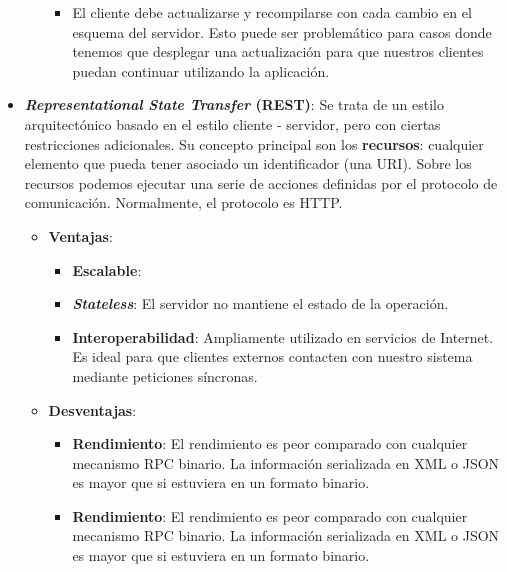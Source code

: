 \begin{itemize}
\begin{itemize}
\begin{itemize}
      \item El cliente debe actualizarse y recompilarse con cada cambio en el esquema del servidor. Esto puede ser problemático para casos donde tenemos que desplegar una actualización para que nuestros clientes puedan continuar utilizando la aplicación.
    \end{itemize}
  \end{itemize}

  \item \textbf{\textit{Representational State Transfer} (REST)}: Se trata de un estilo arquitectónico basado en el estilo cliente - servidor, pero con ciertas restricciones adicionales. \cite{taylorSoftwareArchitectureFoundations2009} Su concepto principal son los \textbf{recursos}: cualquier elemento que pueda tener asociado un identificador (una URI). \cite{richardsonRESTfulWebServices2007} Sobre los recursos podemos ejecutar una serie de acciones definidas por el protocolo de comunicación. Normalmente, el protocolo es HTTP.

  \begin{itemize}
    \item \textbf{Ventajas}:

    \begin{itemize}
      \item \textbf{Escalable}:

      \item \textbf{\textit{Stateless}}: El servidor no mantiene el estado de la operación.

      \item \textbf{Interoperabilidad}: Ampliamente utilizado en servicios de Internet. Es ideal para que clientes externos contacten con nuestro sistema mediante peticiones síncronas. \cite{newmanBuildingMicroservicesDesigning2021}
    \end{itemize}
  \end{itemize}

  \begin{itemize}
    \item \textbf{Desventajas}:

    \begin{itemize}
      \item \textbf{Rendimiento}: El rendimiento es peor comparado con cualquier mecanismo RPC binario. La información serializada en XML o JSON es mayor que si estuviera en un formato binario.

      \item \textbf{Rendimiento}: El rendimiento es peor comparado con cualquier mecanismo RPC binario. La información serializada en XML o JSON es mayor que si estuviera en un formato binario.
    \end{itemize}
  \end{itemize}


\end{itemize}
